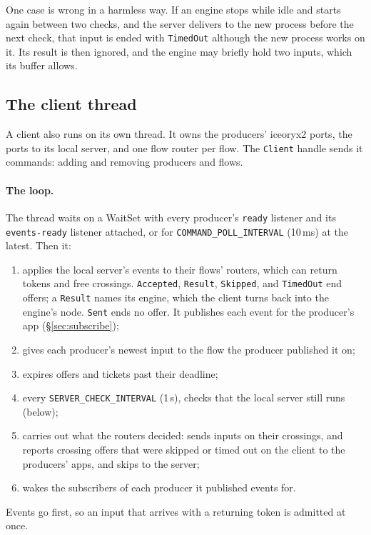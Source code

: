 \documentclass[11pt]{article}
\newcommand{\code}[1]{\texttt{#1}}
\begin{document}
One case is wrong in a harmless way. If an engine stops while idle and starts
again between two checks, and the server delivers to the new process before
the next check, that input is ended with \code{TimedOut} although the new
process works on it. Its result is then ignored, and the engine may briefly
hold two inputs, which its buffer allows.

\subsection{The client thread}
\label{sec:client-thread}

A client also runs on its own thread. It owns the producers' iceoryx2 ports,
the ports to its local server, and one flow router per flow. The
\code{Client} handle sends it commands: adding and removing producers and
flows.

\paragraph{The loop.} The thread waits on a WaitSet with every producer's
\code{ready} listener and its \code{events-ready} listener attached, or for
\code{COMMAND\_POLL\_INTERVAL} (10\,ms) at the latest. Then it:
\begin{enumerate}[nosep]
  \item applies the local server's events to their flows' routers, which can
        return tokens and free crossings. \code{Accepted}, \code{Result},
        \code{Skipped}, and \code{TimedOut} end offers; a \code{Result} names
        its engine, which the client turns back into the engine's node.
        \code{Sent} ends no offer. It publishes each event for the producer's
        app (\S\ref{sec:subscribe});
  \item gives each producer's newest input to the flow the producer
        published it on;
  \item expires offers and tickets past their deadline;
  \item every \code{SERVER\_CHECK\_INTERVAL} (1\,s), checks that the local
        server still runs (below);
  \item carries out what the routers decided: sends inputs on their
        crossings, and reports crossing offers that were skipped or timed out
        on the client to the producers' apps, and skips to the server;
  \item wakes the subscribers of each producer it published events for.
\end{enumerate}
Events go first, so an input that arrives with a returning token is admitted
at once.
\end{document}

